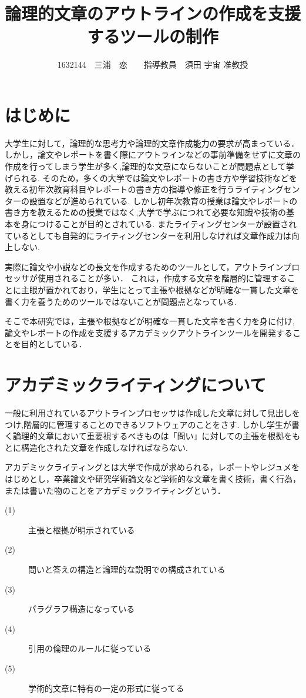 \documentclass[twocolumn,10pt,a4j]{jsarticle}
\title{論理的文章のアウトラインの作成を支援するツールの制作}
\author{1632144　三浦　恋　　指導教員　須田 宇宙 准教授}
\date{}
\begin{document}
\maketitle

\section{はじめに}

大学生に対して，論理的な思考力や論理的文章作成能力の要求が高まっている．
しかし，論文やレポートを書く際にアウトラインなどの事前準備をせずに文章の作成を行ってしまう学生が多く,論理的な文章にならないことが問題点として挙げられる.
そのため，多くの大学では論文やレポートの書き方や学習技術などを教える初年次教育科目やレポートの書き方の指導や修正を行うライティングセンターの設置などが進められている.
しかし初年次教育の授業は論文やレポートの書き方を教えるための授業ではなく,大学で学ぶにつれて必要な知識や技術の基本を身につけることが目的とされている.
またライティングセンターが設置されているとしても自発的にライティングセンターを利用しなければ文章作成力は向上しない.

実際に論文や小説などの長文を作成するためのツールとして，アウトラインプロセッサが使用されることが多い．
これは，作成する文章を階層的に管理することに主眼が置かれており，学生にとって主張や根拠などが明確な一貫した文章を書く力を養うためのツールではないことが問題点となっている.

そこで本研究では，主張や根拠などが明確な一貫した文章を書く力を身に付け,論文やレポートの作成を支援するアカデミックアウトラインツールを開発することを目的としている．

\section{アカデミックライティングについて}
一般に利用されているアウトラインプロセッサは作成した文章に対して見出しをつけ,階層的に管理することのできるソフトウェアのことをさす.
しかし学生が書く論理的文章において重要視するべきものは「問い」に対しての主張を根拠をもとに構造化された文章を作成しなければならない.

アカデミックライティングとは大学で作成が求められる，レポートやレジュメをはじめとし，卒業論文や研究学術論文など学術的な文章を書く技術，書く行為，または書いた物のことをアカデミックライティングという\cite{ren01}．
\begin{description}
  \item[(1)] 主張と根拠が明示されている
  \item[(2)] 問いと答えの構造と論理的な説明での構成されている
  \item[(3)] パラグラフ構造になっている
  \item[(4)] 引用の倫理のルールに従っている
  \item[(5)] 学術的文章に特有の一定の形式に従ってる
\end{description}
\end{document}
